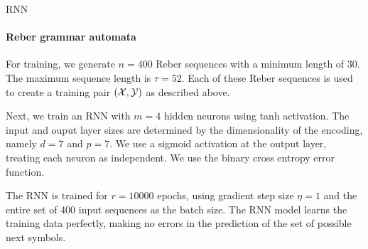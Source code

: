 \begin{frame}{RNN}
\framesubtitle{Reber grammar automata}

    For training, we generate $n=400$ Reber sequences with a minimum
    length of $30$. The maximum sequence length is $\tau=52$. Each of these
    Reber sequences is used to create a training pair $({\mathcal X}, {\mathcal Y})$ as
    described above. 

\medskip
Next, we train an RNN with $m=4$ hidden neurons
    using tanh activation. The input and ouput layer sizes are
    determined by the dimensionality of the encoding, namely $d= 7$ and
    $p=7$. We use a sigmoid activation at the output layer, treating
    each neuron as independent. We use  the binary cross
    entropy error function. 

\medskip

The RNN is trained for $r=10000$ epochs,
    using gradient step size $\eta=1$ and the entire set of 400
    input sequences as the batch size.
    The RNN model 
    learns the training data perfectly, making no errors in the
    prediction of the set of possible next symbols. 


\end{frame}

